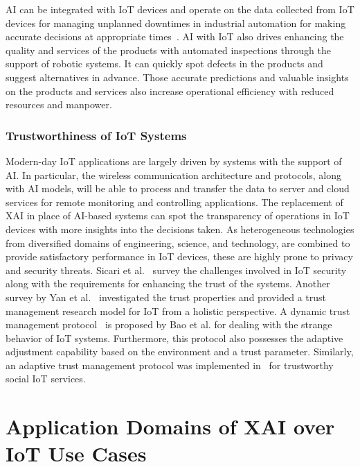 \documentclass[journal]{IEEEtran}
\begin{document}
AI can be integrated with IoT devices and operate on the data collected from IoT devices for managing unplanned downtimes in industrial automation for making accurate decisions at appropriate times~\cite{lv2021ai}. AI with IoT also drives enhancing the quality and services of the products with automated inspections through the support of robotic systems. It can quickly spot defects in the products and suggest alternatives in advance. Those accurate predictions and valuable insights on the products and services also increase operational efficiency with reduced resources and manpower. 

\subsubsection{Trustworthiness of IoT Systems}

Modern-day IoT applications are largely driven by systems with the support of AI. In particular, the wireless communication architecture and protocols, along with AI models, will be able to process and transfer the data to server and cloud services for remote monitoring and controlling applications. The replacement of XAI in place of AI-based systems can spot the transparency of operations in IoT devices with more insights into the decisions taken. As heterogeneous technologies from diversified domains of engineering, science, and technology, are combined to provide satisfactory performance in IoT devices, these are highly prone to privacy and security threats. Sicari et al.~\cite{sicari2015security} survey the challenges involved in IoT security along with the requirements for enhancing the trust of the systems. Another survey by Yan et al.~\cite{yan2014survey} investigated the trust properties and provided a trust management research model for IoT from a holistic perspective. A dynamic trust management protocol~\cite{bao2012dynamic} is proposed by Bao et al. for dealing with the strange behavior of IoT systems. Furthermore, this protocol also possesses the adaptive adjustment capability based on the environment and a trust parameter. Similarly, an adaptive trust management protocol was implemented in~\cite{chen2015trust} for trustworthy social IoT services.

\section{Application Domains of XAI over IoT Use Cases}
\label{sec:XAIapplications}
\end{document}
